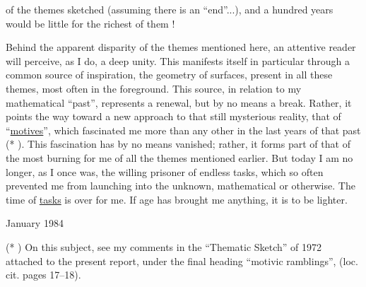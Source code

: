 
of the themes sketched (assuming there is an ``end''...), and
a hundred years would be little for the richest of them !

Behind the apparent disparity of the themes mentioned here,
an attentive reader will perceive, as I do, a deep unity. This
manifests itself in particular through a common source of inspiration,
the geometry of surfaces, present in all these themes, most
often in the foreground. This source, in relation to my mathematical
``past'', represents a renewal, but by no means a
break. Rather, it points the way toward a new approach
to that still mysterious reality, that of ``\uline{motives}'', which
fascinated me more than any other in the last years of that
past (* ). This fascination has by no means vanished;
rather, it forms part of that of the most burning for me of all
the themes mentioned earlier. But today I am no longer,
as I once was, the willing prisoner of endless tasks,
which so often prevented me from launching into the unknown,
mathematical or otherwise. The time of \uline{tasks} is over for me. If
age has brought me anything, it is to be lighter.

January 1984

(* ) On this subject, see my comments in the ``Thematic Sketch''
of 1972 attached to the present report, under the final heading
``motivic ramblings'', (loc. cit. pages 17--18).

